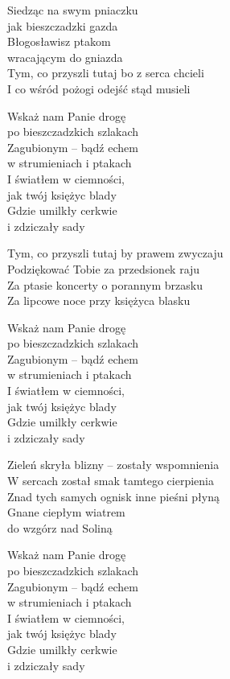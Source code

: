 \begin{text}
\hfill\break
\hfill\break
Siedząc na swym pniaczku\\
jak bieszczadzki gazda\\
Błogosławisz ptakom\\
wracającym do gniazda\\
Tym, co przyszli tutaj bo z serca chcieli\\
I co wśród pożogi odejść stąd musieli

\vin Wskaż nam Panie drogę\\
\vin po bieszczadzkich szlakach\\
\vin Zagubionym – bądź echem\\
\vin w strumieniach i ptakach\\
\vin I światłem w ciemności,\\
\vin jak twój księżyc blady\\
\vin Gdzie umilkły cerkwie\\
\vin i zdziczały sady

Tym, co przyszli tutaj by prawem zwyczaju\\
Podziękować Tobie za przedsionek raju\\
Za ptasie koncerty o porannym brzasku\\
Za lipcowe noce przy księżyca blasku

\vin Wskaż nam Panie drogę\\
\vin po bieszczadzkich szlakach\\
\vin Zagubionym – bądź echem\\
\vin w strumieniach i ptakach\\
\vin I światłem w ciemności,\\
\vin jak twój księżyc blady\\
\vin Gdzie umilkły cerkwie\\
\vin i zdziczały sady

Zieleń skryła blizny – zostały wspomnienia\\
W sercach został smak tamtego cierpienia\\
Znad tych samych ognisk inne pieśni płyną\\
Gnane ciepłym wiatrem\\
do wzgórz nad Soliną

\vin Wskaż nam Panie drogę\\
\vin po bieszczadzkich szlakach\\
\vin Zagubionym – bądź echem\\
\vin w strumieniach i ptakach\\
\vin I światłem w ciemności,\\
\vin jak twój księżyc blady\\
\vin Gdzie umilkły cerkwie\\
\vin i zdziczały sady
\end{text}
